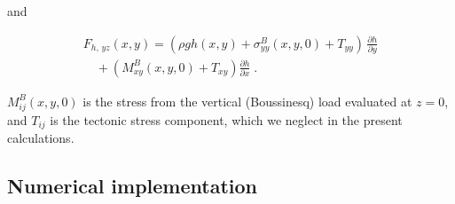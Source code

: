 \documentclass[twocolumn,jgrga]{AGUTeX}
\begin{document}
\begin{article}
and

\begin{equation}
\begin{split}
F_{h, \, yz}(x,y) = ( \rho g h(x,y) + \sigma_{yy}^B(x,y,0) + T_{yy} )\, \frac{\partial h}{ \partial y} \\
\quad + (M_{xy}^{B}(x,y,0) + T_{xy}) \frac{\partial h}{ \partial x}\; . 
\end{split}
\label{eqn:f_hor_yz}
\end{equation}

$M_{ij}^B(x,y,0)$ is the stress from the vertical (Boussinesq) load
evaluated at $z=0$, and $T_{ij}$ is the tectonic stress component, which
we neglect in the present calculations.

\subsection{Numerical implementation}\label{numerical-implementation}


\end{article}
\end{document}
